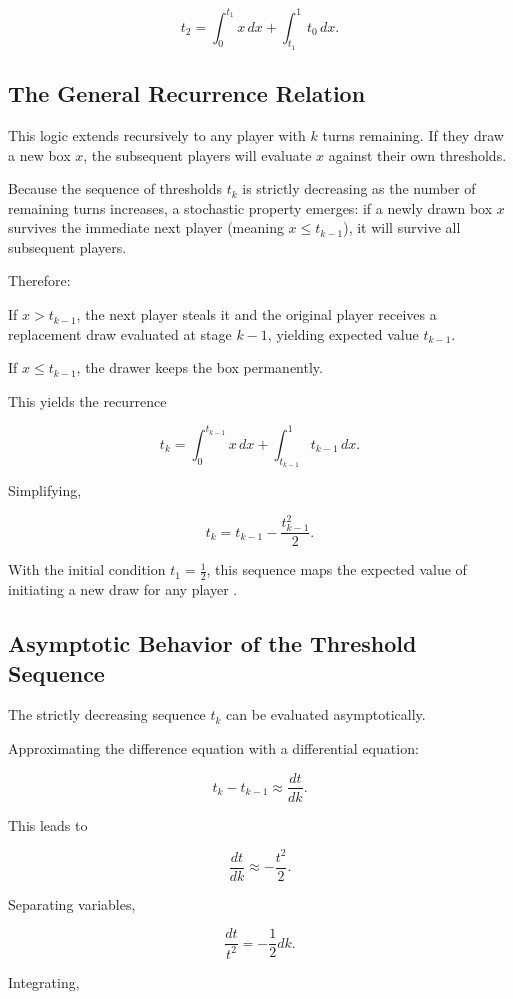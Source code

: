 \documentclass{article}
\begin{document}
\[
t_2 = \int_0^{t_1} x \, dx + \int_{t_1}^1 t_0\,dx .
\]

\subsection{The General Recurrence Relation}

This logic extends recursively to any player with $k$ turns remaining. If they draw a new box $x$, the subsequent players will evaluate $x$ against their own thresholds.

Because the sequence of thresholds $t_k$ is strictly decreasing as the number of remaining turns increases, a stochastic property emerges: if a newly drawn box $x$ survives the immediate next player 
(meaning $x \le t_{k-1}$), it will survive all subsequent players.

Therefore:

If $x > t_{k-1}$, the next player steals it and the original player receives a replacement draw evaluated at stage $k-1$, yielding expected value $t_{k-1}$.

If $x \le t_{k-1}$, the drawer keeps the box permanently.

This yields the recurrence

\[
t_k =
\int_0^{t_{k-1}} x\,dx
+
\int_{t_{k-1}}^1 t_{k-1}\,dx.
\]

Simplifying,

\[
t_k = t_{k-1} - \frac{t_{k-1}^2}{2}.
\]

With the initial condition $t_1 = \tfrac12$, this sequence maps the expected value of initiating a new draw for any player .

\subsection{Asymptotic Behavior of the Threshold Sequence}\label{sec:asymptotics}

The strictly decreasing sequence $t_k$ can be evaluated asymptotically.

Approximating the difference equation with a differential equation:

\[
t_k - t_{k-1} \approx \frac{dt}{dk}.
\]

This leads to

\[
\frac{dt}{dk} \approx -\frac{t^2}{2}.
\]

Separating variables,

\[
\frac{dt}{t^2} = -\frac12 dk.
\]

Integrating,
\end{document}
